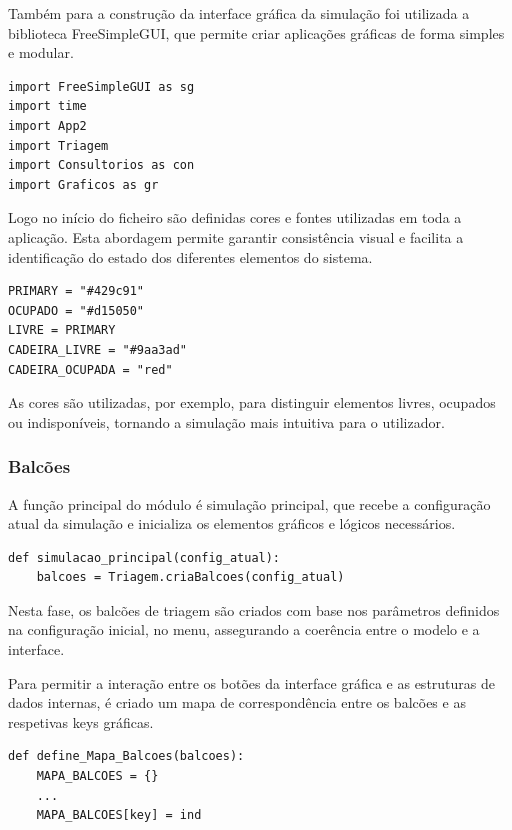 \documentclass[12pt,a4paper]{article} %
\begin{document}
    \medskip
    Também para a construção da interface gráfica da simulação foi utilizada a biblioteca FreeSimpleGUI, que permite criar aplicações gráficas de forma simples e modular.

\begin{verbatim}
import FreeSimpleGUI as sg
import time
import App2
import Triagem
import Consultorios as con
import Graficos as gr

\end{verbatim}

    \medskip
    Logo no início do ficheiro são definidas cores e fontes utilizadas em toda a aplicação. Esta abordagem permite garantir consistência visual e facilita a identificação do estado dos diferentes elementos do sistema. 

\begin{verbatim}
PRIMARY = "#429c91"
OCUPADO = "#d15050"
LIVRE = PRIMARY
CADEIRA_LIVRE = "#9aa3ad"
CADEIRA_OCUPADA = "red"
\end{verbatim}

    As cores são utilizadas, por exemplo, para distinguir elementos livres, ocupados ou indisponíveis, tornando a simulação mais intuitiva para o utilizador.
    
\subsubsection{Balcões}

    \medskip
    A função principal do módulo é simulação principal, que recebe a configuração atual da simulação e inicializa os elementos gráficos e lógicos necessários.

\begin{verbatim}
def simulacao_principal(config_atual):
    balcoes = Triagem.criaBalcoes(config_atual)
\end{verbatim}

    Nesta fase, os balcões de triagem são criados com base nos parâmetros definidos na configuração inicial, no menu, assegurando a coerência entre o modelo e a interface.

    \medskip
    Para permitir a interação entre os botões da interface gráfica e as estruturas de dados internas, é criado um mapa de correspondência entre os balcões e as respetivas keys gráficas.

\begin{verbatim}
def define_Mapa_Balcoes(balcoes):
    MAPA_BALCOES = {}
    ...
    MAPA_BALCOES[key] = ind
\end{verbatim}
\end{document}
